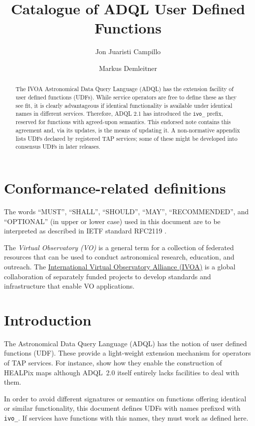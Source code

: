 \documentclass[11pt,a4paper]{ivoa}
\title{Catalogue of ADQL User Defined Functions}
\author[https://wiki.ivoa.net/twiki/bin/view/IVOA/JonJuaristiCampillo]{Jon Juaristi Campillo}
\author[https://wiki.ivoa.net/twiki/bin/view/IVOA/MarkusDemleitner]{Markus Demleitner}
\begin{document}
\begin{abstract}
The IVOA Astronomical Data Query Language (ADQL) has the extension
facility of user defined functions (UDFs).  While service operators are
free to define these as they see fit, it is clearly advantageous if
identical functionality is available under identical names in different
services.  Therefore, ADQL 2.1 has introduced the \verb|ivo_| prefix,
reserved for functions with agreed-upon semantics.  This endorsed note
contains this agreement and, via its updates, is the means of updating
it.  A non-normative appendix lists UDFs declared by registered TAP
services; some of these might be developed into consensus UDFs in later
releases.
\end{abstract}


\section*{Conformance-related definitions}

The words ``MUST'', ``SHALL'', ``SHOULD'', ``MAY'', ``RECOMMENDED'', and
``OPTIONAL'' (in upper or lower case) used in this document are to be
interpreted as described in IETF standard RFC2119 \citep{std:RFC2119}.

The \emph{Virtual Observatory (VO)} is a
general term for a collection of federated resources that can be used
to conduct astronomical research, education, and outreach.
The \href{http://www.ivoa.net}{International
Virtual Observatory Alliance (IVOA)} is a global
collaboration of separately funded projects to develop standards and
infrastructure that enable VO applications.


\section{Introduction}

The Astronomical Data Query Language (ADQL) \citep{2008ivoa.spec.1030O}
has the notion of user defined functions (UDF).  These provide a
light-weight extension mechanism for operators of TAP services.  
For instance, \citet{2016arXiv161109190T} show how they enable the
construction of HEALPix maps although ADQL~2.0 itself entirely lacks
facilities to deal with them.

In order to avoid different signatures or semantics on functions
offering identical or similar functionality,  this document defines UDFs
with names prefixed with \verb|ivo_|.  If services have functions with
this names, they must work as defined here.
\end{document}
